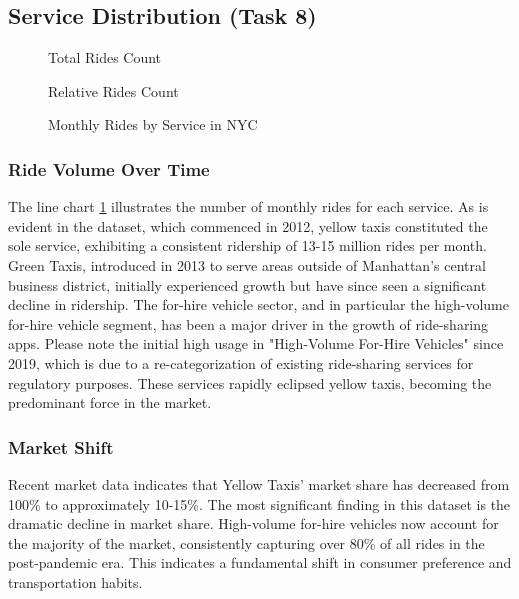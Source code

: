 \documentclass[conference]{IEEEtran}
\begin{document}
\subsection{Service Distribution (Task 8)}

\begin{figure}[htbp]
  \label{fig:service-distribution}
  \centering
  \begin{minipage}[b]{0.95\linewidth}
    
    \caption{Total Rides Count}
  \end{minipage}

  \vspace{1em}

  \begin{minipage}[b]{0.95\linewidth}
    
    \caption{Relative Rides Count}
  \end{minipage}

  \caption{Monthly Rides by Service in NYC}

\end{figure}

\subsubsection*{Ride Volume Over Time} The line chart \ref{fig:service-distribution} illustrates the number of monthly
rides for each service. As is evident in the dataset, which commenced in 2012, yellow taxis constituted the sole service,
exhibiting a consistent ridership of 13-15 million rides per month. Green Taxis, introduced in 2013 to serve areas
outside of Manhattan's central business district, initially experienced growth but have since seen a significant decline
in ridership. The for-hire vehicle sector, and in particular the high-volume for-hire vehicle segment, has been a major
driver in the growth of ride-sharing apps. Please note the initial high usage in "High-Volume For-Hire Vehicles" since 2019,
which is due to a re-categorization of existing ride-sharing services for regulatory purposes. These services
rapidly eclipsed yellow taxis, becoming the predominant force in the market.

\subsubsection*{Market Shift} Recent market data indicates that Yellow Taxis' market share has decreased from 100\% to
approximately 10-15\%. The most significant finding in this dataset is the dramatic decline in market share. High-volume
for-hire vehicles now account for the majority of the market, consistently capturing over 80\% of all rides in the
post-pandemic era. This indicates a fundamental shift in consumer preference and transportation habits.
\end{document}
